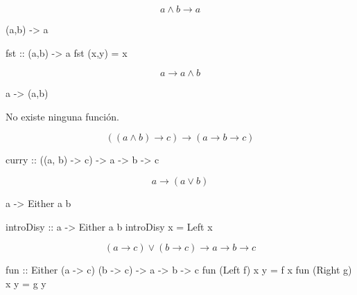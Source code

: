 \documentclass{beamer}
\begin{document}
\begin{frame}[fragile]
  $$a \wedge b \rightarrow a $$
\pause

\begin{sesion}  
(a,b) -> a
\end{sesion}

\pause

\begin{code}
fst :: (a,b) -> a
fst (x,y) = x
\end{code}

\end{frame}

\begin{frame}[fragile]
  $$a \rightarrow a\wedge b $$

\pause
\begin{sesion}
a -> (a,b)
\end{sesion}
  
\pause
No existe ninguna función.
\end{frame}

\begin{frame}[fragile]
  $$((a\wedge b) \rightarrow c) \rightarrow (a \rightarrow b \rightarrow c) $$

  \pause
  
\begin{code}
curry :: ((a, b) -> c) -> a -> b -> c  
\end{code}
\end{frame}


\begin{frame}[fragile]
  $$a \rightarrow (a \vee b)$$

  \pause

\begin{sesion}
a -> Either a b  
\end{sesion}

\pause

\begin{code}
introDisy :: a -> Either a b
introDisy x = Left x  
\end{code}
  
\end{frame}
\begin{frame}[fragile]
  $$(a\rightarrow c) \vee (b\rightarrow c) \rightarrow a \rightarrow b \rightarrow c  $$

  \pause
  
\begin{code}
fun :: Either (a -> c) (b -> c) -> a -> b -> c
fun (Left f)  x y = f x
fun (Right g) x y = g y
\end{code}
\end{frame}
\end{document}
